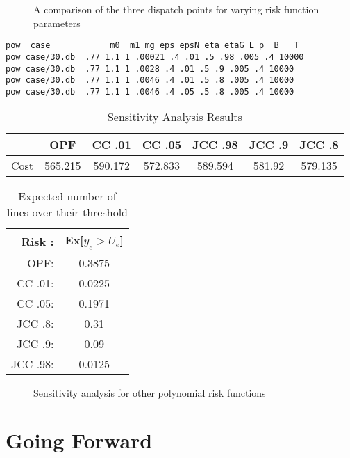 \begin{figure}
\centering

\caption{A comparison of the three dispatch points for varying risk function parameters}\label{figsense}
\end{figure}


\begin{verbatim}
pow  case            m0  m1 mg eps epsN eta etaG L p  B   T
pow case/30.db  .77 1.1 1 .00021 .4 .01 .5 .98 .005 .4 10000
pow case/30.db  .77 1.1 1 .0028 .4 .01 .5 .9 .005 .4 10000
pow case/30.db  .77 1.1 1 .0046 .4 .01 .5 .8 .005 .4 10000
pow case/30.db  .77 1.1 1 .0046 .4 .05 .5 .8 .005 .4 10000
\end{verbatim}

\begin{table}
\centering
 \begin{tabular}{ |c| c c c c c c|}
\hline
& OPF & CC .01 & CC .05 & JCC .98 & JCC .9 & JCC .8 \\
\hline
\hline
Cost & 565.215 & 590.172 & 572.833& 589.594 & 581.92 &579.135\\
\hline
\end{tabular}
\caption{Sensitivity Analysis Results}
\end{table}


\begin{table}
\centering
\begin{tabular}{| r  c |}
\hline
Risk :& Ex[$y_e > U_e$] \\
\hline
\hline
OPF:& 0.3875\\
CC .01:& 0.0225\\
CC .05:& 0.1971 \\
JCC .8:& 0.31 \\
JCC .9:& 0.09 \\
JCC .98:& 0.0125 \\
\hline
\end{tabular}
\caption{Expected number of lines over their threshold}
\end{table}

\begin{figure}

\caption{Sensitivity analysis for other polynomial risk functions}
\end{figure}


\section{Going Forward}

